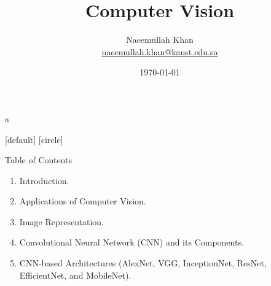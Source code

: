 a\documentclass[10pt]{beamer}
\title[Computer Vision]{Computer Vision}
\theoremstyle{remark}
\theoremstyle{definition}
\begin{document}
\author[KAUST Academy]{
	\begin{tabular}{c} 
	\Large
	Naeemullah Khan\\
    \footnotesize \href{mailto:naeemullah.khan@kaust.edu.sa}{naeemullah.khan@kaust.edu.sa}
\end{tabular}
\vspace{-4ex}}


\date{\today}

\begin{noheadline}
\begin{frame}\maketitle\end{frame}
\end{noheadline}


[default]
[circle]

\begin{frame}{Table of Contents}
\begin{enumerate}
    \item Introduction.
    \item Applications of Computer Vision.
    \item Image Representation.
    \item Convolutional Neural Network (CNN) and its Components.
    \item CNN-based Architectures (AlexNet, VGG, InceptionNet, ResNet, EfficientNet, and MobileNet).
\end{enumerate}
\end{frame}
\end{document}
